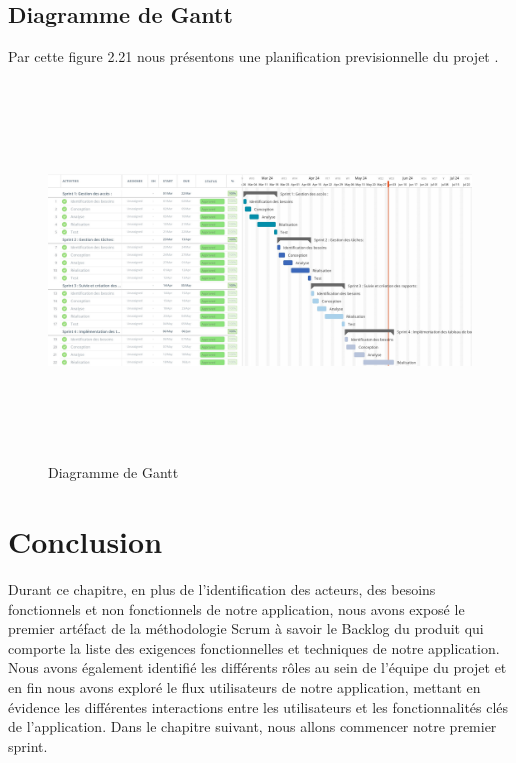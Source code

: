 \subsection{Diagramme de Gantt }

Par cette figure 2.21 nous présentons une planification previsionnelle du projet .

\begin{figure}[ht!]
  \centering
  \includegraphics[width=1\textwidth,height=10cm]{chap2.images/diagramme de gantt.jpeg}
  \caption{Diagramme de Gantt}
\end{figure}







\section*{Conclusion}
\bigskip
\begin{sloppypar}
  Durant ce chapitre, en plus de l'identification  des acteurs, des besoins fonctionnels et non fonctionnels de notre application,  nous avons exposé le premier artéfact de la méthodologie Scrum à savoir le Backlog du produit qui comporte la liste des exigences fonctionnelles et techniques de notre application. Nous avons également identifié les différents rôles au sein de l'équipe du projet et en fin nous avons  exploré le flux utilisateurs de notre application, mettant en évidence les différentes interactions entre les utilisateurs et les fonctionnalités clés de l'application.
  Dans le chapitre suivant, nous allons commencer notre premier sprint.
\end{sloppypar}






